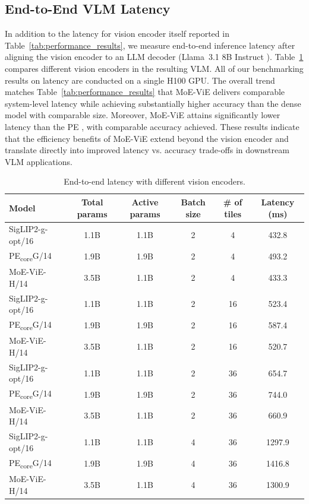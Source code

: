 \documentclass[runningheads]{llncs}
\begin{document}
\subsection{End-to-End VLM Latency}
\label{appx_e2e_latency}

In addition to the latency for vision encoder itself reported in Table~\ref{tab:performance_results}, we measure end-to-end inference latency after aligning the vision encoder to an LLM decoder (Llama~3.1 8B Instruct \cite{llama3}). Table~\ref{end2end_latency} compares different vision encoders in the resulting VLM. All of our benchmarking results on latency are conducted on a single H100 GPU. The overall trend matches Table~\ref{tab:performance_results} that MoE-ViE delivers comparable system-level latency while achieving substantially higher accuracy than the dense model with comparable size. Moreover, MoE-ViE attains significantly lower latency than the PE \cite{pe}, with comparable accuracy achieved. These results indicate that the efficiency benefits of MoE-ViE extend beyond the vision encoder and translate directly into improved latency vs. accuracy trade-offs in downstream VLM applications.

\begin{table}[htbp]
\centering
\caption{End-to-end latency with different vision encoders.}
\label{end2end_latency}
\fontsize{6.5}{8}\selectfont
\setlength{\tabcolsep}{6pt} 
\begin{tabular}{lccccc}
\toprule
Model & Total params & Active params & Batch size & \# of tiles & Latency (ms) \\
\midrule
SigLIP2-g-opt/16 \cite{siglip2}  & 1.1B  & 1.1B & 2 & 4   & 432.8  \\
PE\textsubscript{core}G/14 \cite{pe} & 1.9B  & 1.9B & 2 & 4  & 493.2  \\
MoE-ViE-H/14   & 3.5B  & 1.1B & 2 & 4   & 433.3  \\
\midrule
SigLIP2-g-opt/16 \cite{siglip2} &1.1B   & 1.1B & 2 & 16  & 523.4  \\
PE\textsubscript{core}G/14 \cite{pe} & 1.9B & 1.9B & 2 & 16  & 587.4  \\
MoE-ViE-H/14  & 3.5B  & 1.1B & 2 & 16  & 520.7  \\
\midrule
SigLIP2-g-opt/16 \cite{siglip2}  &1.1B  & 1.1B & 2 & 36  & 654.7  \\
PE\textsubscript{core}G/14 \cite{pe} &1.9B  & 1.9B & 2 & 36  & 744.0  \\
MoE-ViE-H/14  &3.5B   & 1.1B & 2 & 36  & 660.9  \\
\midrule
SigLIP2-g-opt/16 \cite{siglip2} & 1.1B   & 1.1B & 4 & 36  & 1297.9 \\
PE\textsubscript{core}G/14 \cite{pe} & 1.9B  & 1.9B & 4 & 36  & 1416.8 \\
MoE-ViE-H/14 & 3.5B    & 1.1B & 4 & 36  & 1300.9 \\
\bottomrule
\end{tabular}
\end{table}

%
%


\end{document}

